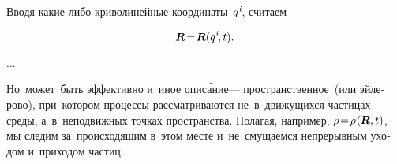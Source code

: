 \begin{otherlanguage}{russian}

Вводя какие\hbox{-}либо криволинейные координаты~${q^{\hspace{.1ex}i}\hspace{-0.4ex}}$, считаем

\nopagebreak\vspace{-0.2em}\begin{equation}\label{materialcoordinates}
\bm{R} \hspace{-0.25ex} = \hspace{-0.4ex} \bm{R}(q^{\hspace{.1ex}i} \hspace{-0.3ex}, t) .
\end{equation}

...


Но~может~быть эффективно и~иное опис\'{а}ние\:--- пространственное~(или эйлерово), при~котором процессы рассматриваются не~в~движущихся частицах среды, а~в~неподвижных точках пространства. Полагая, например, ${\rho \!=\! \rho \hspace{.16ex} (\hspace{-0.1ex}\bm{R}, t)}$, мы следим за~происходящим в~этом месте и~не~смущаемся непрерывным уходом и~приходом частиц.

\end{otherlanguage}



\label{para:differentiation}

